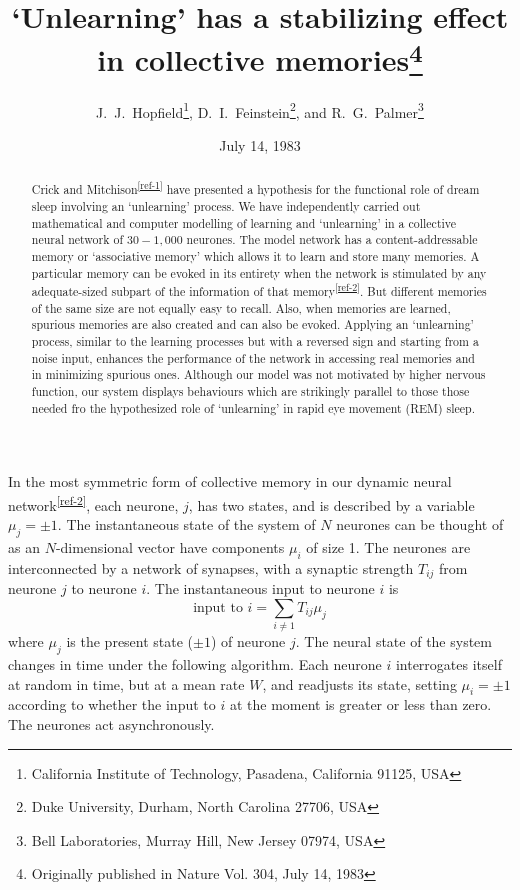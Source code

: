 \documentclass[11pt,letterpaper]{article}
\title{`Unlearning' has a stabilizing effect in collective memories\footnote{Originally published in Nature Vol. 304, July 14, 1983}}
\author{J.~J.~Hopfield\footnote{California Institute of Technology, Pasadena, California 91125, USA}, D.~I.~Feinstein\footnote{Duke University, Durham, North Carolina 27706, USA}, and R.~G.~Palmer\footnote{Bell Laboratories, Murray Hill, New Jersey 07974, USA}}
\date{July 14, 1983}
\begin{document}
	\maketitle
	
	\begin{abstract}
		Crick and Mitchison\textsuperscript{\ref{ref-1}} have presented a hypothesis for the functional role of dream sleep involving an `unlearning' process. We have independently carried out mathematical and computer modelling of learning and `unlearning' in a collective neural network of $30-1,000$ neurones. The model network has a content-addressable memory or `associative memory' which allows it to learn and store many memories. A particular memory can be evoked in its entirety when the network is stimulated by any adequate-sized subpart of the information of that memory\textsuperscript{\ref{ref-2}}. But different memories of the same size are not equally easy to recall. Also, when memories are learned, spurious memories are also created and can also be evoked. Applying an `unlearning' process, similar to the learning processes but with a reversed sign and starting from a noise input, enhances the performance of the network in accessing real memories and in minimizing spurious ones. Although our model was not motivated by higher nervous function, our system displays behaviours which are strikingly parallel to those those needed fro the hypothesized role of `unlearning' in rapid eye movement (REM) sleep. \\
	\end{abstract}

	In the most symmetric form of collective memory in our dynamic neural network\textsuperscript{\ref{ref-2}}, each neurone, $j$, has two states, and is described by a variable $\mu_j = \pm1$. The instantaneous state of the system of $N$ neurones can be thought of as an $N$-dimensional vector have components $\mu_i$ of size 1. The neurones are interconnected by a network of synapses, with a synaptic strength $T_{ij}$ from neurone $j$ to neurone $i$. The instantaneous input to neurone $i$ is
	\begin{equation}
		\text{input to } i=\sum_{i\ne1} T_{ij} \mu_j
	\end{equation}
	where $\mu_j$ is the present state ($\pm1$) of neurone $j$. The neural state of the system changes in time under the following algorithm. Each neurone $i$ interrogates itself at random in time, but at a mean rate $W$, and readjusts its state, setting $\mu_i=\pm1$ according to whether the input to $i$ at the moment is greater or less than zero. The neurones act asynchronously.
	
\end{document}
